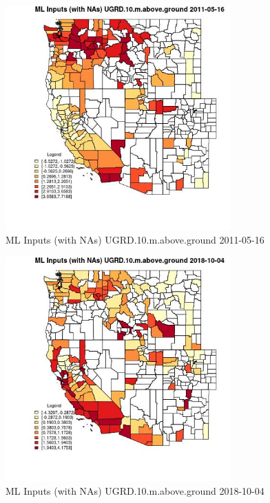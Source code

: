 \begin{figure} 
\centering  
\includegraphics[width=0.77\textwidth]{Code_Outputs/Report_ML_input_PM25_Step4_part_f_de_duplicated_aveswNAs_CountyUGRD10mabovegroundMean2011-05-16.jpg} 
\caption{\label{fig:Report_ML_input_PM25_Step4_part_f_de_duplicated_aveswNAsCountyUGRD10mabovegroundMean2011-05-16}ML Inputs (with NAs) UGRD.10.m.above.ground 2011-05-16} 
\end{figure} 
 

\begin{figure} 
\centering  
\includegraphics[width=0.77\textwidth]{Code_Outputs/Report_ML_input_PM25_Step4_part_f_de_duplicated_aveswNAs_CountyUGRD10mabovegroundMean2018-10-04.jpg} 
\caption{\label{fig:Report_ML_input_PM25_Step4_part_f_de_duplicated_aveswNAsCountyUGRD10mabovegroundMean2018-10-04}ML Inputs (with NAs) UGRD.10.m.above.ground 2018-10-04} 
\end{figure} 
 

